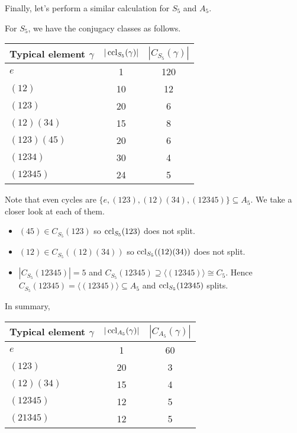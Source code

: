 \documentclass[10pt, a4paper, twoside]{report}
\begin{document}
Finally, let's perform a similar calculation for \(S_5\) and \(A_5\).
\begin{example}
    For \(S_5\), we have the conjugacy classes as follows.
    \begin{table}[H]
        \centering
        \begin{tabularx}{0.6\textwidth}{Xcc}
            \toprule
            Typical element \(\gamma\) & \(|\operatorname{ccl}_{S_5}(\gamma)|\) & \(|C_{S_5}(\gamma)|\) \\
            \midrule
            \(e\) & 1 & 120 \\
            \((12)\) & 10 & 12 \\
            \((123)\) & 20 & 6 \\
            \((12)(34)\) & 15 & 8 \\
            \((123)(45)\) & 20 & 6 \\
            \((1234)\) & 30 & 4 \\
            \((12345)\) & 24 & 5 \\
            \bottomrule 
        \end{tabularx}
    \end{table}
    Note that even cycles are \(\{e,(123),(12)(34),(12345)\}\subseteq A_5\). We take a closer look at each of them.
    \begin{itemize}
        \item \((45)\in C_{S_5}(123)\) so \(\operatorname{ccl}_{S_5}(123)\) does not split.
        \item \((12)\in C_{S_5}((12)(34))\) so \(\operatorname{ccl}_{S_5}((12)(34))\) does not split.
        \item \(|C_{S_5}(12345)|=5\) and \(C_{S_5}(12345)\supseteq\langle(12345)\rangle\cong C_5\). Hence \(C_{S_5}(12345)=\langle (12345)\rangle\subseteq A_5\)
         and \(\operatorname{ccl}_{S_5}(12345)\) splits.
    \end{itemize}
    In summary,
    \begin{table}[H]
        \centering
        \begin{tabularx}{0.6\textwidth}{Xcc}
            \toprule
            Typical element \(\gamma\) & \(|\operatorname{ccl}_{A_5}(\gamma)|\) & \(|C_{A_5}(\gamma)|\) \\
            \midrule
            \(e\) & 1 & 60 \\
            \((123)\) & 20 & 3 \\
            \((12)(34)\) & 15 & 4 \\
            \((12345)\) & 12 & 5 \\
            \((21345)\) & 12 & 5 \\
            \bottomrule 
        \end{tabularx}
    \end{table}
\end{example}
\end{document}
